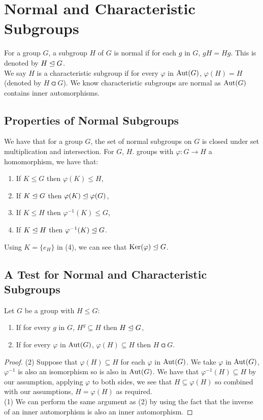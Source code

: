 \section{Normal and Characteristic Subgroups}

For a group $G$, a subgroup $H$ of $G$ is normal if for each $g$ in $G$,
$gH = Hg$. This is denoted by $H \trianglelefteq G$.
\\[\baselineskip]
We say $H$ is a characteristic subgroup if for every $\varphi$ in $\operatorname{Aut}(G)$,
$\varphi(H) = H$ (denoted by $H \csub G$). We know characteristic subgroups
are normal as $\operatorname{Aut}(G)$ contains inner automorphisms.

\subsection{Properties of Normal Subgroups}

We have that for a group $G$, the set of normal subgroups on $G$
is closed under set multiplication and intersection. For $G$, $H$.
groups with $\varphi : G \to H$ a homomorphism, we have that: \begin{enumerate}
    \item If $K \leq G$ then $\varphi(K) \leq H$,
    \item If $K \trianglelefteq G$ then $\varphi(K) \trianglelefteq \varphi(G)$,
    \item If $K \leq H$ then $\varphi^{-1}(K) \leq G$,
    \item If $K \trianglelefteq H$ then $\varphi^{-1}(K) \trianglelefteq G$.
\end{enumerate} Using $K = \{e_H\}$ in (4), we can see that $\operatorname{Ker}(\varphi) \trianglelefteq G$.


\subsection{A Test for Normal and Characteristic Subgroups}

Let $G$ be a group with $H \leq G$: \begin{enumerate}
    \item If for every $g$ in $G$, $H^g \subseteq H$ then $H \trianglelefteq G$,
    \item If for every $\varphi$ in $\operatorname{Aut}(G)$, $\varphi(H) \subseteq H$ 
        then $H \csub G$.
\end{enumerate}

\begin{proof}
    (2) Suppose that $\varphi(H) \subseteq H$ for each $\varphi$ in $\operatorname{Aut}(G)$.
    We take $\varphi$ in $\operatorname{Aut}(G)$, $\varphi^{-1}$ is also an isomorphism
    so is also in $\operatorname{Aut}(G)$. We have that $\varphi^{-1}(H) \subseteq H$
    by our assumption, applying $\varphi$ to both sides, we see that
    $H \subseteq \varphi(H)$ so combined with our assumptions, 
    $H = \varphi(H)$ as required.
    \\[\baselineskip]
    (1) We can perform the same argument as (2) by using the fact that the
    inverse of an inner automorphism is also an inner automorphism.
\end{proof}

